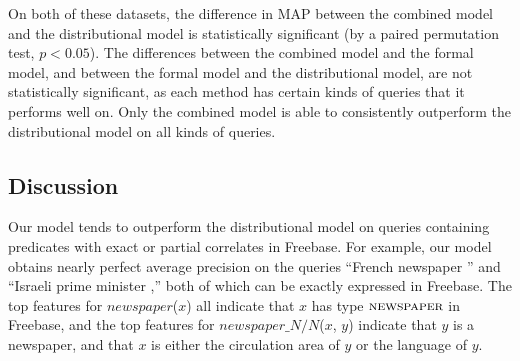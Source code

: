 \documentclass[11pt,letterpaper]{article}
\newcommand{\blank}{\underline{\hspace{.5cm}}}
\newcommand{\lexicalpredicate}[1]{\ensuremath{\textit{#1}}}
\newcommand{\formalpredicate}[1]{{\small \ensuremath{\textsc{#1}}}}
\begin{document}
On both of these datasets, the difference in MAP between the combined model and the distributional
model is statistically significant (by a paired permutation test, $p < 0.05$).  The differences
between the combined model and the formal model, and between the formal model and the
distributional model, are not statistically significant, as each method has certain kinds of
queries that it performs well on.  Only the combined model is able to consistently outperform the
distributional model on all kinds of queries.

\subsection{Discussion}

Our model tends to outperform the distributional model on queries containing predicates with exact
or partial correlates in Freebase. For example, our model obtains nearly perfect average precision
on the queries ``French newspaper \blank{}'' and ``Israeli prime minister \blank{},'' both of which
can be exactly expressed in Freebase.  The top features for \lexicalpredicate{newspaper}($x$) all
indicate that $x$ has type \formalpredicate{newspaper} in Freebase, and the top features for
\lexicalpredicate{newspaper\_N/N}($x$, $y$) indicate that $y$ is a newspaper, and that $x$ is
either the circulation area of $y$ or the language of $y$.
\end{document}
